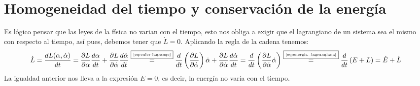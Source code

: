 \section{Homogeneidad del tiempo y conservación de la energía}
Es lógico pensar que las leyes de la física no varian con el tiempo, esto nos obliga a exigir que el lagrangiano de un sistema sea el mismo con respecto al tiempo, así pues, debemos tener que $\dot{L}=0$.
Aplicando la regla de la cadena tenemos:
\begin{equation*}
    \dot{L}=\frac{dL(\alpha, \dot{\alpha})}{dt}=\frac{\partial L}{\partial \alpha}\frac{d\alpha}{dt}+\frac{\partial L}{\partial \dot{\alpha}}\frac{d\dot{\alpha}}{dt}\overset{\fbox{\tiny \ref{eq:euler-lagrange}}}{=}\frac{d}{dt}\left(\frac{\partial L}{\partial \dot{\alpha}}\right)\dot{\alpha}+\frac{\partial L}{\partial \dot{\alpha}}\frac{d\dot{\alpha}}{dt}=\frac{d}{dt}\left(\frac{\partial L}{\partial \dot{\alpha}}\dot{\alpha}\right)\overset{\fbox{\tiny \ref{eq:energia_lagrangiana}}}{=}\frac{d}{dt}\left(E+L\right)=\dot{E}+\dot{L}
\end{equation*}
La igualdad anterior nos lleva a la expresión $\dot{E}=0$, es decir, la energía no varía con el tiempo.
